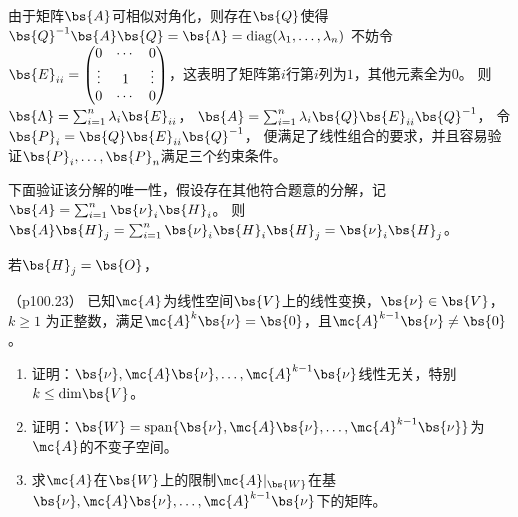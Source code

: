 \documentclass[12pt, a4paper, oneside, UTF8]{ctexbook}
\begin{document}
\begin{solution}
    由于矩阵$\bs{A}$可相似对角化，则存在$\bs{Q}$使得$\bs{Q}^{-1}\bs{A}\bs{Q}=\bs{\Lambda}=\mathrm{diag}(\lambda_1,\ldots,\lambda_n)$
    不妨令$\bs{E}_{ii}=\begin{pmatrix}
        0& \cdots &0 \\
        \vdots & 1 & \vdots \\
        0 & \cdots & 0
    \end{pmatrix}$，这表明了矩阵第$i$行第$i$列为$1$，其他元素全为$0$。
    则$\bs{\Lambda}=\sum_{i=1}^n \lambda_i \bs{E}_{ii}$，
    $\bs{A}=\sum_{i=1}^n\lambda_i \bs{Q}\bs{E}_{ii}\bs{Q}^{-1}$，
    令$\bs{P}_i=\bs{Q}\bs{E}_{ii}\bs{Q}^{-1}$，
    便满足了线性组合的要求，并且容易验证$\bs{P}_{i},\ldots,\bs{P}_{n}$满足三个约束条件。

    下面验证该分解的唯一性，假设存在其他符合题意的分解，记$\bs{A}=\sum_{i=1}^n\bs{\nu}_i\bs{H}_i$。
    则$\bs{A}\bs{H}_j=\sum_{i=1}^n \bs{\nu}_i\bs{H}_i\bs{H}_j=\bs{\nu}_i\bs{H}_j$。

    若$\bs{H}_j=\bs{O}$，
\end{solution}

\begin{question}（p100.23）
已知$\mc{A}$为线性空间$\bs{V}$上的线性变换，$\bs{\nu}\in \bs{V}$，$k \geq 1$ 为正整数，满足$\mc{A}^k\bs{\nu}=\bs{0}$，且$\mc{A}^{k-1} \bs{\nu} \neq \bs{0}$。
\begin{enumerate}[label=(\arabic*)]
    \item 证明：$\bs{\nu},\mc{A}\bs{\nu},\ldots,\mc{A}^{k-1}\bs{\nu}$线性无关，特别$k \leq \mathrm{dim}\bs{V}$。
    \item 证明：$\bs{W}=\mathrm{span}\{\bs{\nu},\mc{A}\bs{\nu},\ldots,\mc{A}^{k-1}\bs{\nu}\}$为$\mc{A}$的不变子空间。
    \item 求$\mc{A}$在$\bs{W}$上的限制$\mc{A}|_{\bs{W}}$在基$\bs{\nu},\mc{A}\bs{\nu},\ldots,\mc{A}^{k-1}\bs{\nu}$下的矩阵。
\end{enumerate}

\end{question}
\end{document}
